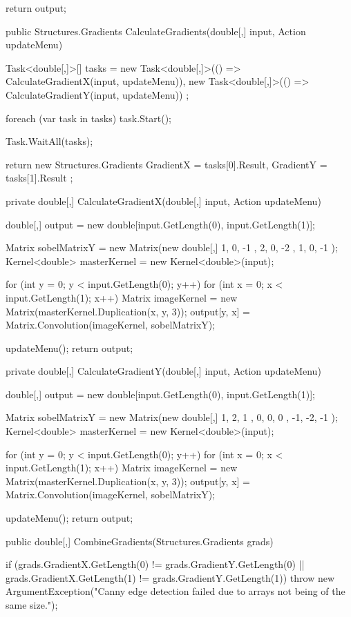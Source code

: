 \begin{flushleft}
\begin{cscode}
{{        return output;
    }

    public Structures.Gradients CalculateGradients(double[,] input, Action updateMenu)
    {
        Task<double[,]>[] tasks =
        {
            new Task<double[,]>(() => CalculateGradientX(input, updateMenu)),
            new Task<double[,]>(() => CalculateGradientY(input, updateMenu))
        };

        foreach (var task in tasks) task.Start();

        Task.WaitAll(tasks);

        return new Structures.Gradients
        {
            GradientX = tasks[0].Result,
            GradientY = tasks[1].Result
        };
    }

    private double[,] CalculateGradientX(double[,] input, Action updateMenu)
    {
        double[,] output = new double[input.GetLength(0), input.GetLength(1)];

        Matrix sobelMatrixY = new Matrix(new double[,] { { 1, 0, -1 }, { 2, 0, -2 }, { 1, 0, -1 } });
        Kernel<double> masterKernel = new Kernel<double>(input);

        for (int y = 0; y < input.GetLength(0); y++)
        {
            for (int x = 0; x < input.GetLength(1); x++)
            {
                Matrix imageKernel = new Matrix(masterKernel.Duplication(x, y, 3));
                output[y, x] = Matrix.Convolution(imageKernel, sobelMatrixY);
            }
        }

        updateMenu();
        return output;
    }

    private double[,] CalculateGradientY(double[,] input, Action updateMenu)
    {
        double[,] output = new double[input.GetLength(0), input.GetLength(1)];

        Matrix sobelMatrixY = new Matrix(new double[,] { { 1, 2, 1 }, { 0, 0, 0 }, { -1, -2, -1 } });
        Kernel<double> masterKernel = new Kernel<double>(input);

        for (int y = 0; y < input.GetLength(0); y++)
        {
            for (int x = 0; x < input.GetLength(1); x++)
            {
                Matrix imageKernel = new Matrix(masterKernel.Duplication(x, y, 3));
                output[y, x] = Matrix.Convolution(imageKernel, sobelMatrixY);
            }
        }

        updateMenu();
        return output;
    }

    public double[,] CombineGradients(Structures.Gradients grads)
    {
        if (grads.GradientX.GetLength(0) != grads.GradientY.GetLength(0) || grads.GradientX.GetLength(1) != grads.GradientY.GetLength(1))
            throw new ArgumentException("Canny edge detection failed due to arrays not being of the same size.");

}}
\end{cscode}
\end{flushleft}
